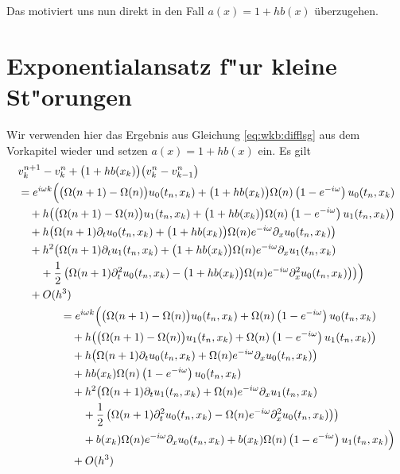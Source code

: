 Das motiviert uns nun direkt in den Fall $a(x) = 1 + hb(x)$ überzugehen.

\section{Exponentialansatz f"ur kleine St"orungen}

Wir verwenden hier das Ergebnis aus Gleichung \eqref{eq:wkb:difflsg} aus dem Vorkapitel wieder und setzen $a(x) = 1 + hb(x)$ ein.
Es gilt
\begin{align}
\begin{split}
&v^{n+1}_k - v^n_k + \bigl(1 + hb(x_k)\bigr) \bigl( v^n_k - v^n_{k-1} \bigr)\\
&= e^{i \omega k} \Bigl(
\bigl(\Omega(n+1) - \Omega(n) \bigr) u_0(t_n, x_k) + \bigl(1 + hb(x_k)\bigr) \Omega(n) \left(1-e^{-i \omega}\right) u_0(t_n, x_k)\\
&\quad + h \bigl( \bigl(\Omega(n+1) - \Omega(n) \bigr) u_1(t_n, x_k) + \bigl(1 + hb(x_k)\bigr) \Omega(n) \left(1-e^{-i \omega}\right) u_1(t_n, x_k) \bigr)\\
&\quad + h \bigl( \Omega(n+1) \partial_t u_0(t_n, x_k) + \bigl(1 + hb(x_k)\bigr) \Omega(n) e^{-i \omega} \partial_x u_0(t_n, x_k) \bigr)\\
&\quad + h^2 \bigl( \Omega(n+1) \partial_t u_1(t_n, x_k) + \bigl(1 + hb(x_k)\bigr) \Omega(n) e^{-i \omega} \partial_x u_1(t_n, x_k)\\
&\qquad + \frac{1}{2} \left( \Omega(n+1) \partial^2_t u_0(t_n, x_k) - \bigl(1 + hb(x_k)\bigr) \Omega(n) e^{-i \omega} \partial^2_x u_0(t_n, x_k) \right) \bigr) 
\Bigr)\\&\quad + O(h^3)
\end{split}\\
\begin{split}\label{eq:wkb:letzteglg}
&= e^{i \omega k} \Bigl(
\bigl(\Omega(n+1) - \Omega(n) \bigr) u_0(t_n, x_k) + \Omega(n) \left(1-e^{-i \omega}\right) u_0(t_n, x_k)\\
&\quad + h \bigl( \bigl(\Omega(n+1) - \Omega(n) \bigr) u_1(t_n, x_k) + \Omega(n) \left(1-e^{-i \omega}\right) u_1(t_n, x_k) \bigr)\\
&\quad + h \bigl( \Omega(n+1) \partial_t u_0(t_n, x_k) + \Omega(n) e^{-i \omega} \partial_x u_0(t_n, x_k) \bigr)\\
&\quad + h b(x_k) \Omega(n) \left(1-e^{-i \omega}\right) u_0(t_n, x_k)\\
&\quad + h^2 \bigl( \Omega(n+1) \partial_t u_1(t_n, x_k) + \Omega(n) e^{-i \omega} \partial_x u_1(t_n, x_k)\\
&\qquad + \frac{1}{2} \left( \Omega(n+1) \partial^2_t u_0(t_n, x_k) - \Omega(n) e^{-i \omega} \partial^2_x u_0(t_n, x_k) \right) \bigr)\\
&\qquad + b(x_k) \Omega(n) e^{-i \omega} \partial_x u_0(t_n, x_k) + b(x_k) \Omega(n) \left(1-e^{-i \omega}\right) u_1(t_n, x_k)
\Bigr)\\&\quad + O(h^3)
\end{split}
\end{align}
